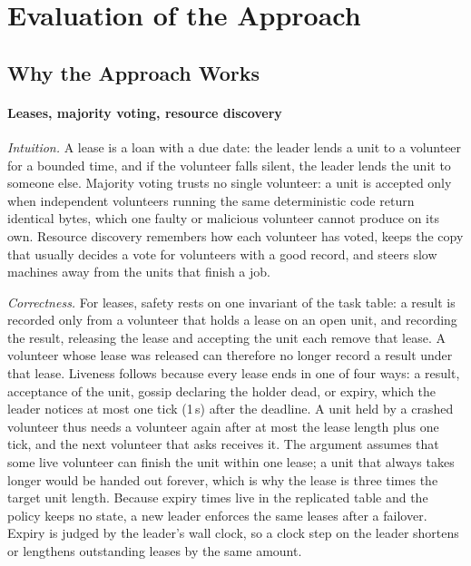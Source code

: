 \section{Evaluation of the Approach}
\label{sec:evaluation}

\subsection{Why the Approach Works}

\paragraph{Leases, majority voting, resource discovery} \emph{Intuition.} A lease is a loan with a due date: the leader lends a unit to a volunteer for a bounded time, and if the volunteer falls silent, the leader lends the unit to someone else. Majority voting trusts no single volunteer: a unit is accepted only when independent volunteers running the same deterministic code return identical bytes, which one faulty or malicious volunteer cannot produce on its own. Resource discovery remembers how each volunteer has voted, keeps the copy that usually decides a vote for volunteers with a good record, and steers slow machines away from the units that finish a job.

\emph{Correctness.} For leases, safety rests on one invariant of the task table: a result is recorded only from a volunteer that holds a lease on an open unit, and recording the result, releasing the lease and accepting the unit each remove that lease. A volunteer whose lease was released can therefore no longer record a result under that lease. Liveness follows because every lease ends in one of four ways: a result, acceptance of the unit, gossip declaring the holder dead, or expiry, which the leader notices at most one tick (1\,s) after the deadline. A unit held by a crashed volunteer thus needs a volunteer again after at most the lease length plus one tick, and the next volunteer that asks receives it. The argument assumes that some live volunteer can finish the unit within one lease; a unit that always takes longer would be handed out forever, which is why the lease is three times the target unit length. Because expiry times live in the replicated table and the policy keeps no state, a new leader enforces the same leases after a failover. Expiry is judged by the leader's wall clock, so a clock step on the leader shortens or lengthens outstanding leases by the same amount.

